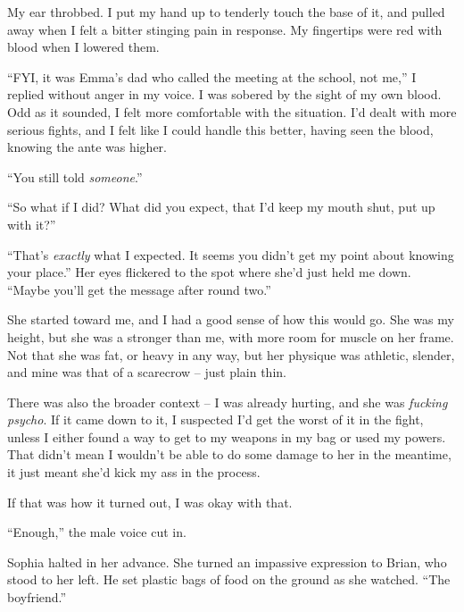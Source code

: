 My ear throbbed.  I put my hand up to tenderly touch the base of it, and pulled away when I felt a bitter stinging pain in response.  My fingertips were red with blood when I lowered them.



``FYI, it was Emma's dad who called the meeting at the school, not me,'' I replied without anger in my voice.  I was sobered by the sight of my own blood.  Odd as it sounded, I felt more comfortable with the situation.  I'd dealt with more serious fights, and I felt like I could handle this better, having seen the blood, knowing the ante was higher.



``You still told \emph{someone}.''



``So what if I did?  What did you expect, that I'd keep my mouth shut, put up with it?''



``That's \emph{exactly} what I expected.  It seems you didn't get my point about knowing your place.''  Her eyes flickered to the spot where she'd just held me down.  ``Maybe you'll get the message after round two.''



She started toward me, and I had a good sense of how this would go.  She was my height, but she was a stronger than me, with more room for muscle on her frame.  Not that she was fat, or heavy in any way, but her physique was athletic, slender, and mine was that of a scarecrow – just plain thin.



There was also the broader context – I was already hurting, and she was \emph{fucking psycho}.  If it came down to it, I suspected I'd get the worst of it in the fight, unless I either found a way to get to my weapons in my bag or used my powers.  That didn't mean I wouldn't be able to do some damage to her in the meantime, it just meant she'd kick my ass in the process.



If that was how it turned out, I was okay with that.



``Enough,'' the male voice cut in.



Sophia halted in her advance.  She turned an impassive expression to Brian, who stood to her left.  He set plastic bags of food on the ground as she watched.  ``The boyfriend.''



